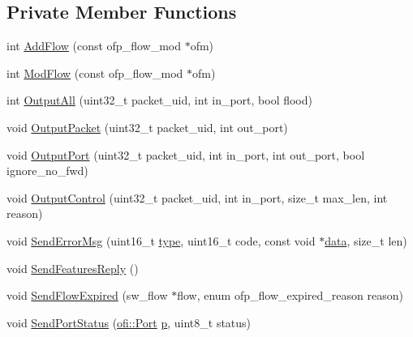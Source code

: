 \subsection*{Private Member Functions}
\begin{DoxyCompactItemize}
\item 
int \hyperlink{classns3_1_1OpenFlowSwitchNetDevice_aabaef64af287627f43101399e05f6c88}{Add\+Flow} (const ofp\+\_\+flow\+\_\+mod $\ast$ofm)
\item 
int \hyperlink{classns3_1_1OpenFlowSwitchNetDevice_a43202e5e95605e3cf8002fdeb5533dd6}{Mod\+Flow} (const ofp\+\_\+flow\+\_\+mod $\ast$ofm)
\item 
int \hyperlink{classns3_1_1OpenFlowSwitchNetDevice_acdb8beff0a4c62b1bf9367adf8fbcd22}{Output\+All} (uint32\+\_\+t packet\+\_\+uid, int in\+\_\+port, bool flood)
\item 
void \hyperlink{classns3_1_1OpenFlowSwitchNetDevice_a8c1bc70a75d5e0552a6102d3d03ad7d0}{Output\+Packet} (uint32\+\_\+t packet\+\_\+uid, int out\+\_\+port)
\item 
void \hyperlink{classns3_1_1OpenFlowSwitchNetDevice_a8a28ed9cc94a54077fa3e23c55d975c7}{Output\+Port} (uint32\+\_\+t packet\+\_\+uid, int in\+\_\+port, int out\+\_\+port, bool ignore\+\_\+no\+\_\+fwd)
\item 
void \hyperlink{classns3_1_1OpenFlowSwitchNetDevice_a00821a76c4a946368ac4a6053cc538e2}{Output\+Control} (uint32\+\_\+t packet\+\_\+uid, int in\+\_\+port, size\+\_\+t max\+\_\+len, int reason)
\item 
void \hyperlink{classns3_1_1OpenFlowSwitchNetDevice_a8a511cf5cf8b5f00dea8ac2d7f14f091}{Send\+Error\+Msg} (uint16\+\_\+t \hyperlink{visualizer-ideas_8txt_add98db9e15e2a58cf2b57623e7aa893a}{type}, uint16\+\_\+t code, const void $\ast$\hyperlink{topology-example-sim_8cc_a26c65296e316af77b787dc77469bb2a4}{data}, size\+\_\+t len)
\item 
void \hyperlink{classns3_1_1OpenFlowSwitchNetDevice_a4f85126d582b80926f755d70f328a254}{Send\+Features\+Reply} ()
\item 
void \hyperlink{classns3_1_1OpenFlowSwitchNetDevice_a3af4a49e4a3897b107b7bac09cb1ae16}{Send\+Flow\+Expired} (sw\+\_\+flow $\ast$flow, enum ofp\+\_\+flow\+\_\+expired\+\_\+reason reason)
\item 
void \hyperlink{classns3_1_1OpenFlowSwitchNetDevice_a3111ef7ec072cf59ddabe3a7c3e89e67}{Send\+Port\+Status} (\hyperlink{structns3_1_1ofi_1_1Port}{ofi\+::\+Port} \hyperlink{lte__link__budget__x2__handover__measures_8m_ac9de518908a968428863f829398a4e62}{p}, uint8\+\_\+t status)

\end{DoxyCompactItemize}
